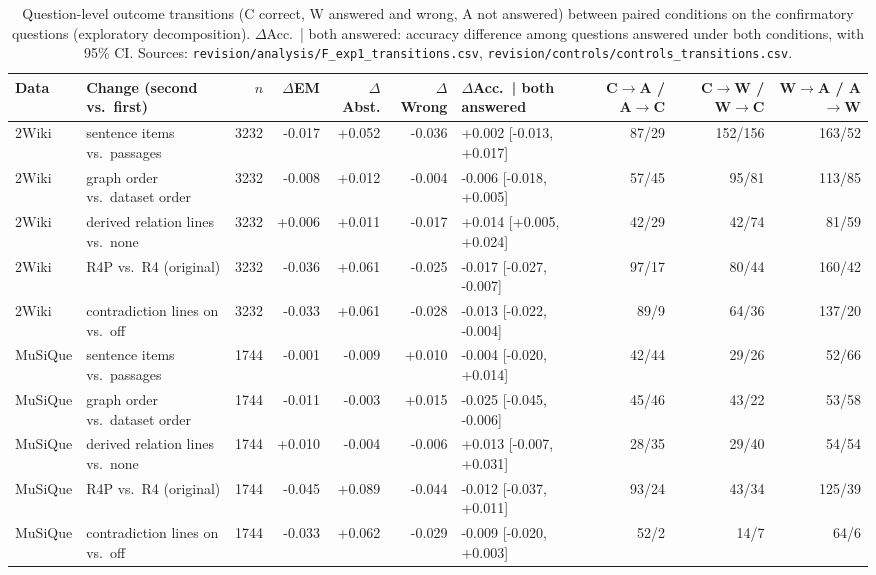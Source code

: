 \begin{table}[t]
\centering
\footnotesize
\begin{adjustbox}{max width=\linewidth}
\begin{tabular}{@{}llrrrrlrrr@{}}
\toprule
Data & Change (second vs.\ first) & $n$ & $\Delta$EM & $\Delta$Abst. & $\Delta$Wrong & $\Delta$Acc.\ | both answered & C$\to$A / A$\to$C & C$\to$W / W$\to$C & W$\to$A / A$\to$W \\
\midrule
2Wiki & sentence items vs.\ passages & 3232 & -0.017 & +0.052 & -0.036 & +0.002 [-0.013, +0.017] & 87/29 & 152/156 & 163/52 \\
2Wiki & graph order vs.\ dataset order & 3232 & -0.008 & +0.012 & -0.004 & -0.006 [-0.018, +0.005] & 57/45 & 95/81 & 113/85 \\
2Wiki & derived relation lines vs.\ none & 3232 & +0.006 & +0.011 & -0.017 & +0.014 [+0.005, +0.024] & 42/29 & 42/74 & 81/59 \\
2Wiki & R4P vs.\ R4 (original) & 3232 & -0.036 & +0.061 & -0.025 & -0.017 [-0.027, -0.007] & 97/17 & 80/44 & 160/42 \\
2Wiki & contradiction lines on vs.\ off & 3232 & -0.033 & +0.061 & -0.028 & -0.013 [-0.022, -0.004] & 89/9 & 64/36 & 137/20 \\
\midrule
MuSiQue & sentence items vs.\ passages & 1744 & -0.001 & -0.009 & +0.010 & -0.004 [-0.020, +0.014] & 42/44 & 29/26 & 52/66 \\
MuSiQue & graph order vs.\ dataset order & 1744 & -0.011 & -0.003 & +0.015 & -0.025 [-0.045, -0.006] & 45/46 & 43/22 & 53/58 \\
MuSiQue & derived relation lines vs.\ none & 1744 & +0.010 & -0.004 & -0.006 & +0.013 [-0.007, +0.031] & 28/35 & 29/40 & 54/54 \\
MuSiQue & R4P vs.\ R4 (original) & 1744 & -0.045 & +0.089 & -0.044 & -0.012 [-0.037, +0.011] & 93/24 & 43/34 & 125/39 \\
MuSiQue & contradiction lines on vs.\ off & 1744 & -0.033 & +0.062 & -0.029 & -0.009 [-0.020, +0.003] & 52/2 & 14/7 & 64/6 \\
\bottomrule
\end{tabular}
\end{adjustbox}
\caption{Question-level outcome transitions (C correct, W answered and wrong, A not answered) between paired conditions on the confirmatory questions (exploratory decomposition). $\Delta$Acc.\ | both answered: accuracy difference among questions answered under both conditions, with 95\% CI. Sources: \texttt{revision/\allowbreak analysis/\allowbreak F\_exp1\_transitions.csv}, \texttt{revision/\allowbreak controls/\allowbreak controls\_transitions.csv}.}
\label{tab:transitions}
\end{table}
